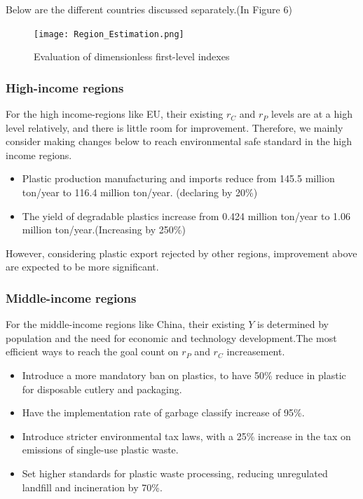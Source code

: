 \documentclass{mcmthesis}
\begin{document}
	Below are the different countries discussed separately.(In Figure 6)
     \begin{figure}[H]
		\centering
		 \texttt{[image: Region\_Estimation.png]}
		\caption{Evaluation of dimensionless first-level indexes}
	\end{figure} 

 \subsubsection{High-income regions}
	For the high income-regions like EU, their existing $r_C$ and $r_P$ levels are at a high level relatively, and there is little room for improvement. Therefore, we mainly consider making changes below to reach environmental safe standard in the high income regions. 
	\begin{itemize}
		\item Plastic production manufacturing and imports reduce from 145.5 million ton/year to 116.4 million ton/year. (declaring by 20\%)
		\item The yield of degradable plastics increase from 0.424 million ton/year to 1.06 million ton/year.(Increasing by 250\%)%
	 \end{itemize}
	   
	 However, considering plastic export rejected by other regions, improvement above are expected to be more significant.
	
 \subsubsection{Middle-income regions}
	 For the middle-income regions like China, their existing $Y$ is determined by population and the need for economic and technology development.The most efficient ways to reach the goal count on $r_P$ and $r_C$ increasement.
	 \begin{itemize}
		\item Introduce a more mandatory ban on plastics, to have 50\% reduce in plastic for disposable cutlery and packaging.
		\item Have the implementation rate of garbage classify increase of 95\%.
		\item Introduce stricter environmental tax laws, with a 25\% increase in the tax on emissions of single-use plastic waste.
		\item Set higher standards for plastic waste processing, reducing unregulated landfill and incineration by 70\%. 
	 \end{itemize}
\end{document}
